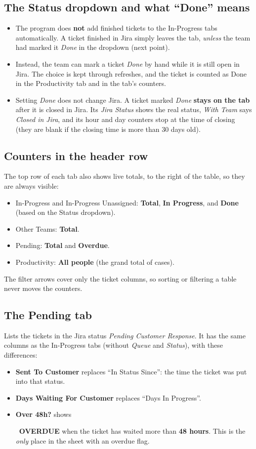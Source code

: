 \documentclass[11pt,a4paper]{article}
\newcommand{\swatch}[1]{\colorbox{#1}{\rule{0pt}{1.6ex}\hspace{1.4em}}}
\let\oldsubsection\subsection
\renewcommand{\subsection}{\needspace{7\baselineskip}\oldsubsection}
\begin{document}
\subsection{The Status dropdown and what ``Done'' means}
\begin{itemize}
  \item The program does \textbf{not} add finished tickets to the In-Progress tabs automatically. A ticket finished in Jira
    simply leaves the tab, \emph{unless} the team had marked it \emph{Done} in the dropdown (next point).
  \item Instead, the team can mark a ticket \emph{Done} by hand while it is still open in Jira. The choice is kept
    through refreshes, and the ticket is counted as Done in the Productivity tab and in the tab's counters.
  \item Setting \emph{Done} does not change Jira. A ticket marked \emph{Done} \textbf{stays on the tab} after it is
    closed in Jira. Its \emph{Jira Status} shows the real status, \emph{With Team} says \emph{Closed in Jira}, and its
    hour and day counters stop at the time of closing (they are blank if the closing time is more than 30 days old).
\end{itemize}

\subsection{Counters in the header row}
The top row of each tab also shows live totals, to the right of the table, so they are always visible:
\begin{itemize}
  \item In-Progress and In-Progress Unassigned: \textbf{Total}, \textbf{In Progress}, and \textbf{Done} (based on the
    Status dropdown).
  \item Other Teams: \textbf{Total}.
  \item Pending: \textbf{Total} and \textbf{Overdue}.
  \item Productivity: \textbf{All people} (the grand total of cases).
\end{itemize}
The filter arrows cover only the ticket columns, so sorting or filtering a table never moves the counters.

\subsection{The Pending tab}
Lists the tickets in the Jira status \emph{Pending Customer Response}. It has the same columns as the In-Progress tabs (without \emph{Queue} and \emph{Status}), with
these differences:
\begin{itemize}
  \item \textbf{Sent To Customer} replaces ``In Status Since'': the time the ticket was put into that status.
  \item \textbf{Days Waiting For Customer} replaces ``Days In Progress''.
  \item \textbf{Over 48h?} shows \swatch{sheetred}~\textbf{OVERDUE} when the ticket has waited more than
    \textbf{48 hours}. This is the \emph{only} place in the sheet with an overdue flag.
\end{itemize}
\end{document}
